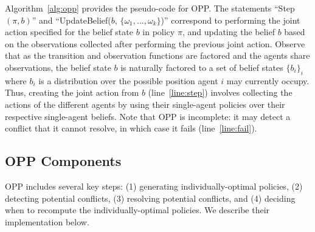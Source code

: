\documentclass[letterpaper]{article} %
\begin{document}
Algorithm~\ref{alg:opp} provides the pseudo-code for OPP. 
The statements ``Step$(\pi,b)$'' and ``UpdateBelief($b$, $\{\omega_1,\ldots,\omega_k\}$)'' correspond to 
performing the joint action specified for the belief state $b$ in policy $\pi$, 
and updating the belief $b$ based on the observations collected after performing the previous joint action. 
Observe that as the transition and observation functions are factored and the agents share observations, 
the belief state $b$ is naturally factored to a set of belief states $\{b_i\}_i$ where $b_i$ is a distribution over the possible position agent $i$ may currently occupy. Thus, creating the joint action from $b$ (line~\ref{line:step}) involves collecting the actions of the different agents by using their single-agent policies over their respective single-agent beliefs. Note that OPP is incomplete: it may detect a conflict that it cannot resolve, in which case it fails (line~\ref{line:fail}). 


\subsection{OPP Components}
OPP includes several key steps: 
(1) generating individually-optimal policies, 
(2) detecting potential conflicts, 
(3) resolving potential conflicts, 
and (4) deciding when to recompute the individually-optimal policies. 
We describe their implementation below. 



\end{document}
